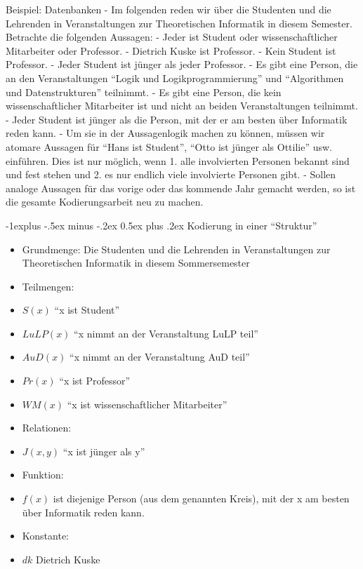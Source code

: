 \documentclass[a4paper]{article}
\makeatletter
\renewcommand{\subsection}{\@startsection{subsection}{2}{0mm}%
                {-1explus -.5ex minus -.2ex}%
                {0.5ex plus .2ex}%
                {\normalfont\normalsize\bfseries}}
\makeatother
\begin{document}
\begin{multicols}{3}
  Beispiel: Datenbanken - Im folgenden reden wir über die Studenten und
  die Lehrenden in Veranstaltungen zur Theoretischen Informatik in diesem
  Semester. Betrachte die folgenden Aussagen: - Jeder ist Student oder
  wissenschaftlicher Mitarbeiter oder Professor. - Dietrich Kuske ist
  Professor. - Kein Student ist Professor. - Jeder Student ist jünger als
  jeder Professor. - Es gibt eine Person, die an den Veranstaltungen
  ``Logik und Logikprogrammierung'' und ``Algorithmen und
  Datenstrukturen'' teilnimmt. - Es gibt eine Person, die kein
  wissenschaftlicher Mitarbeiter ist und nicht an beiden Veranstaltungen
  teilnimmt. - Jeder Student ist jünger als die Person, mit der er am
  besten über Informatik reden kann. - Um sie in der Aussagenlogik machen
  zu können, müssen wir atomare Aussagen für ``Hans ist Student'', ``Otto
  ist jünger als Ottilie'' usw. einführen. Dies ist nur möglich, wenn 1.
  alle involvierten Personen bekannt sind und fest stehen und 2. es nur
  endlich viele involvierte Personen gibt. - Sollen analoge Aussagen für
  das vorige oder das kommende Jahr gemacht werden, so ist die gesamte
  Kodierungsarbeit neu zu machen.

  \subsection{Kodierung in einer
    ``Struktur''}\label{kodierung-in-einer-struktur}

  \begin{itemize}
    \itemsep1pt\parskip0pt
    \item
          Grundmenge: Die Studenten und die Lehrenden in Veranstaltungen zur
          Theoretischen Informatik in diesem Sommersemester
    \item
          Teilmengen:
    \item
          $S(x)$ ``x ist Student''
    \item
          $LuLP(x)$ ``x nimmt an der Veranstaltung LuLP teil''
    \item
          $AuD(x)$ ``x nimmt an der Veranstaltung AuD teil''
    \item
          $Pr(x)$ ``x ist Professor''
    \item
          $WM(x)$ ``x ist wissenschaftlicher Mitarbeiter''
    \item
          Relationen:
    \item
          $J(x,y)$ ``x ist jünger als y''
    \item
          Funktion:
    \item
          $f(x)$ ist diejenige Person (aus dem genannten Kreis), mit der x am
          besten über Informatik reden kann.
    \item
          Konstante:
    \item
          $dk$ Dietrich Kuske
  \end{itemize}


\end{multicols}
\end{document}

